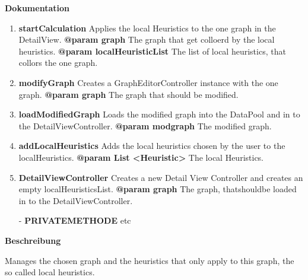 \textbf{Dokumentation}
\begin{enumerate}[+]
	\item{
	\textbf{startCalculation} \newline
	Applies the local Heuristics to the one graph in the DetailView. \newline
	\textbf{@param graph} The graph that get colloerd by the local heuristics. \newline
	\textbf{@param localHeuristicList} The list of local heuristics, that collors the one graph.
}

	\item{
	\textbf{modifyGraph} \newline
	Creates a GraphEditorController instance with the one graph. \newline
	\textbf{@param graph} The graph that should be modified. \newline
}
	\item{
	\textbf{loadModifiedGraph} \newline
	Loads the modified graph into the DataPool and in to the DetailViewController. \newline
	\textbf{@param modgraph} The modified graph. \newline
}
	\item{
	\textbf{addLocalHeuristics} \newline
	Adds the local heuristics chosen by the user to the localHeuristics. \newline
	\textbf{@param List <Heuristic>} The local Heuristics. \newline
}
	\item{
	\textbf{DetailViewController} \newline
	Creates a new Detail View Controller and creates an empty localHeuristicsList. \newline
	\textbf{@param graph} The graph, thatshouldbe loaded in to the DetailViewController. \newline
}
	\item[-]{
		\textbf{PRIVATEMETHODE} etc
	}
\end{enumerate}

\textbf{Beschreibung}
 
Manages the chosen graph and the heuristics that only apply to this graph, the so called local heuristics. \newline

